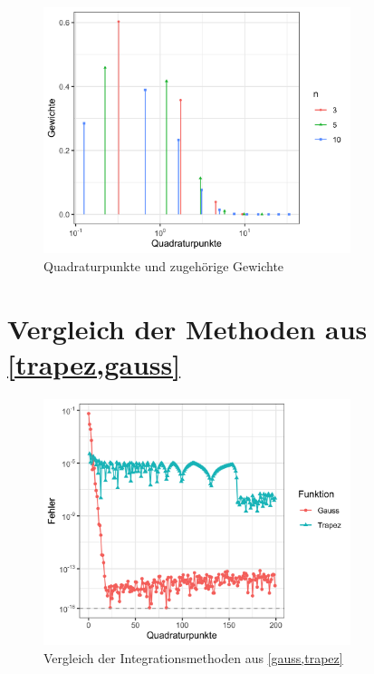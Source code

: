 \documentclass[12pt,a4paper]{scrartcl}
\numberwithin{equation}{section}
\numberwithin{myalgctr}{section}
\numberwithin{mytheoremctr}{section}
\numberwithin{mykorollarctr}{section}
\numberwithin{mylemmactr}{section}
\numberwithin{mybeispielctr}{section}
\begin{document}
	\begin{figure}[H]
		\begin{center}
			\includegraphics[width=0.8\textwidth]{../plots/quadraturpunkte-n-zusammen.png}
		\end{center}
		\caption{Quadraturpunkte und zugeh\"orige Gewichte}
		\label{fig:quadraturpunkte}
	\end{figure}
	
	\newpage
	\section{Vergleich der Methoden aus \cref{trapez,gauss}}
	\begin{figure}[H]
		\begin{center}
			\includegraphics[width=0.8\textwidth]{../plots/aufgabe-e2.png}
		\end{center}
		\caption{Vergleich der Integrationsmethoden aus \cref{gauss,trapez}}
		\label{fig:vergleich}	
	\end{figure}
\end{document}

